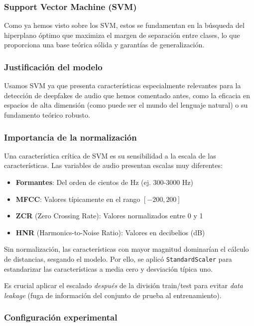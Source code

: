 \subsubsection{Support Vector Machine (SVM)}

Como ya hemos visto sobre los SVM, estos se fundamentan en la búsqueda del hiperplano óptimo que maximiza el margen de separación entre clases, lo que proporciona una base teórica sólida y garantías de generalización.

\subsubsection*{Justificación del modelo}

Usamos SVM ya que presenta características especialmente relevantes para la detección de deepfakes de audio que hemos comentado antes, como la eficacia en espacios de alta dimensión (como puede ser el mundo del lenguaje natural) o su fundamento teórico robusto. 

\subsubsection*{Importancia de la normalización}

Una característica crítica de SVM es su sensibilidad a la escala de las características. Las variables de audio presentan escalas muy diferentes:

\begin{itemize}
    \item \textbf{Formantes}: Del orden de cientos de Hz (ej. 300-3000 Hz)
    \item \textbf{MFCC}: Valores típicamente en el rango \([-200, 200]\)
    \item \textbf{ZCR} (Zero Crossing Rate): Valores normalizados entre 0 y 1
    \item \textbf{HNR} (Harmonics-to-Noise Ratio): Valores en decibelios (dB)
\end{itemize}

Sin normalización, las características con mayor magnitud dominarían el cálculo de distancias, sesgando el modelo. Por ello, se aplicó \texttt{StandardScaler} para estandarizar las características a media cero y desviación típica uno.

Es crucial aplicar el escalado \textit{después} de la división train/test para evitar \textit{data leakage} (fuga de información del conjunto de prueba al entrenamiento).

\subsubsection*{Configuración experimental}

